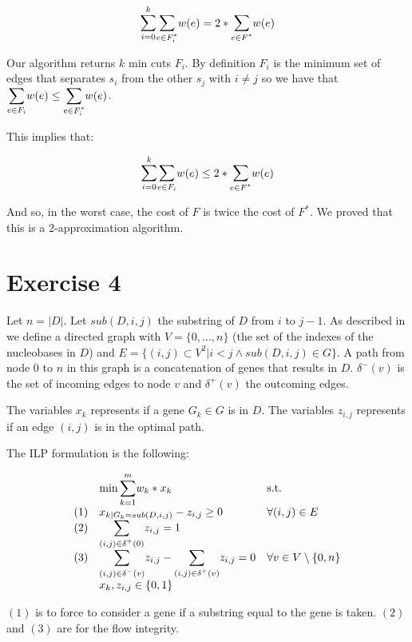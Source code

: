 \documentclass[paper=a4, fontsize=11pt]{scrartcl} %
\numberwithin{equation}{section} %
\numberwithin{figure}{section} %
\numberwithin{table}{section} %
\begin{document}
\[
\mathlarger{\sum}_{i = 0}^k \mathlarger{\sum}_{e \in F_i^*} w(e) = 2*\mathlarger{\sum}_{e \in F^*} w(e)
\]

Our algorithm returns $k$ min cuts $F_i$. By definition $F_i$ is the minimum set of edges that separates $s_i$ from the other $s_j$ with $i \ne j$ so we have that $\mathlarger{\sum}_{e \in F_i} w(e) \leq \mathlarger{\sum}_{e \in F_i^*} w(e)$.

This implies that:

\[
\mathlarger{\sum}_{i = 0}^k \mathlarger{\sum}_{e \in F_i} w(e) \leq 2*\mathlarger{\sum}_{e \in F^*} w(e)
\]

And so, in the worst case, the cost of $F$ is twice the cost of $F^*$. We proved that this is a 2-approximation algorithm.

\newpage
\section{Exercise 4}

Let $n = |D|$. Let $sub(D,i,j)$ the substring of $D$ from $i$ to $j-1$. As described in \cite{chris} we define a directed graph with $V = \{0, ..., n\}$ (the set of the indexes of the nucleobases in $D$) and $E = \{(i,j) \subset V^2| i < j \land sub(D,i,j) \in G\}$. A path from node $0$ to $n$ in this graph is a concatenation of genes that results in $D$. $\delta^-(v)$ is the set of incoming edges to node $v$ and $\delta^+(v)$ the outcoming edges. 

The variables $x_k$ represents if a gene $G_k \in G$ is in $D$.
The variables $z_{i,j}$ represents if an edge $(i,j)$ is in the optimal path.

The ILP formulation is the following:

\[
    \begin{array}{lll}
    & \min \mathlarger{\sum}_{k = 1}^m w_k*x_k & \text{s.t.}\\
    (1) & x_{k|G_k = sub(D,i,j)} - z_{i,j} \geq 0 & \forall (i,j) \in E\\
    (2) & \mathlarger{\sum}_{(i,j) \in \delta^+(0)} z_{i,j} = 1 & \\
    (3) & \mathlarger{\sum}_{(i,j) \in \delta^-(v)} z_{i,j} - \mathlarger{\sum}_{(i,j) \in \delta^+(v)} z_{i,j} = 0 & \forall v \in V \setminus \{0,n\}\\
    & x_k, z_{i,j} \in \{0,1\} & \\
    \end{array}
\]

$(1)$ is to force to consider a gene if a substring equal to the gene is taken. $(2)$ and $(3)$ are for the flow integrity.
\end{document}
